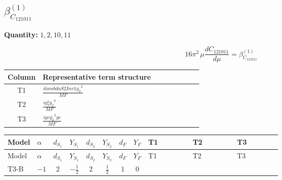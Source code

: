 \documentclass[8pt]{article}
\begin{document}
\begin{landscape}
\section*{$\beta_{C_{121011}}^{(1)}$}
\noindent\textbf{Quantity: }$\mathrm{1,2,10,11}$\par\smallskip
\[16\pi^2\,\mu\frac{d C_{121011}}{d\mu}=\beta_{C_{121011}}^{(1)}\]
\begin{center}
\begin{tabular}{@{}c >{\raggedright\arraybackslash}p{0.82\linewidth}@{}}
\toprule
Column & Representative term structure \\
\midrule
T1 & \(\displaystyle \frac{i lambdaS2Inv1 \overline{y_{2}}^{2}}{MF}\) \\
\midrule
T2 & \(\displaystyle \frac{i g_{2}^{2} \overline{y_{2}}^{2}}{MF}\) \\
\midrule
T3 & \(\displaystyle \frac{i ye \overline{y_{2}}^{2} \overline{ye}}{MF}\) \\
\midrule
\bottomrule
\end{tabular}
\end{center}
\smallskip
\tiny
\begin{longtable}{@{}llcccccc >{\raggedright\arraybackslash}p{0.21\linewidth} >{\raggedright\arraybackslash}p{0.21\linewidth} >{\raggedright\arraybackslash}p{0.21\linewidth}@{}}
\toprule
Model & $\alpha$ & $d_{S_1}$ & $Y_{S_1}$ & $d_{S_2}$ & $Y_{S_2}$ & $d_F$ & $Y_F$ & T1 & T2 & T3 \\
\midrule
\endfirsthead
\toprule
Model & $\alpha$ & $d_{S_1}$ & $Y_{S_1}$ & $d_{S_2}$ & $Y_{S_2}$ & $d_F$ & $Y_F$ & T1 & T2 & T3 \\
\midrule
\endhead
T3-B & $-1$ & $2$ & $-\frac{1}{2}$ & $2$ & $\frac{1}{2}$ & $1$ & $0$ & \scriptsize\adjustbox{max width=\linewidth}{$\begin{gathered} \frac{i lambdaS2Inv1 \overline{y_{2}}^{2}}{4 MF}\end{gathered}$} & \scriptsize\adjustbox{max width=\linewidth}{$\begin{gathered} \frac{3 i g_{2}^{2} \overline{y_{2}}^{2}}{8 MF}\end{gathered}$} & \scriptsize\adjustbox{max width=\linewidth}{$\begin{gathered} - \frac{i ye \overline{y_{2}}^{2} \overline{ye}}{8 MF}\end{gathered}$} \\
\midrule
\bottomrule
\end{longtable}
\clearpage

\end{landscape}
\end{document}
